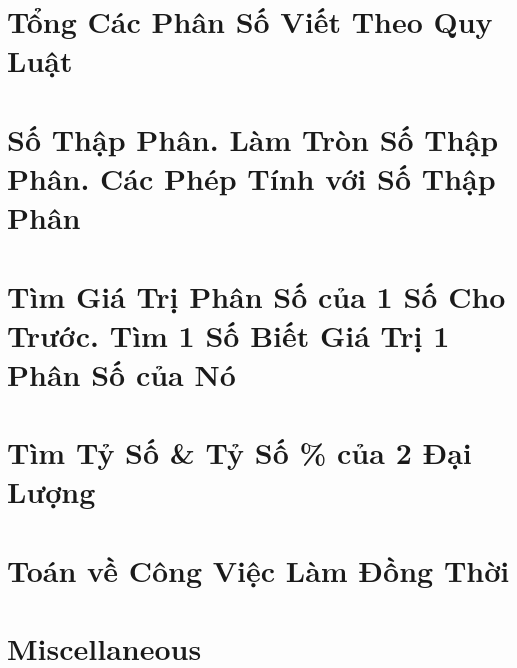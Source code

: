\documentclass{article}
\begin{document}
\section{Tổng Các Phân Số Viết Theo Quy Luật}


\section{Số Thập Phân. Làm Tròn Số Thập Phân. Các Phép Tính với Số Thập Phân}


\section{Tìm Giá Trị Phân Số của 1 Số Cho Trước. Tìm 1 Số Biết Giá Trị 1 Phân Số của Nó}


\section{Tìm Tỷ Số \& Tỷ Số \% của 2 Đại Lượng}


\section{Toán về Công Việc Làm Đồng Thời}


\section{Miscellaneous}


\printbibliography[heading=bibintoc]
	
\end{document}
